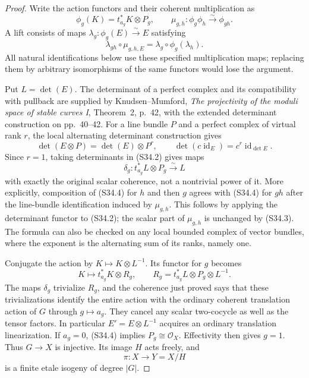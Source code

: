 \begin{proof}
Write the action functors and their coherent multiplication
as
\[
 \phi_g(K)=t_{a_g}^*K\otimes P_g,
 \qquad
 \mu_{g,h}:\phi_g\phi_h\xrightarrow{\sim}\phi_{gh}.
\]
A lift consists of maps
$\lambda_g:\phi_g(E)\xrightarrow{\sim}E$ satisfying
\[
 \lambda_{gh}\circ\mu_{g,h,E}
       =\lambda_g\circ\phi_g(\lambda_h).
 \tag{S34.2}
\]
All natural identifications below use these specified
multiplication maps; replacing them by arbitrary
isomorphisms of the same functors would lose the argument.

Put $L=\det(E)$. The determinant of a perfect complex and
its compatibility with pullback are supplied by
Knudsen--Mumford, \emph{The projectivity of the moduli
space of stable curves I}, Theorem~2, p.~42, with the
extended determinant construction on pp.~40--42.
For a line bundle $P$ and a perfect complex of virtual
rank $r$, the local alternating determinant construction
gives
\[
 \det(E\otimes P)=\det(E)\otimes P^r,
 \qquad \det(c\operatorname{id}_E)=c^r\operatorname{id}_{\det E}.
 \tag{S34.3}
\]
Since $r=1$, taking determinants in (S34.2) gives maps
\[
 \delta_g:t_{a_g}^*L\otimes P_g\xrightarrow{\sim}L
 \tag{S34.4}
\]
with exactly the original scalar coherence, not a nontrivial
power of it. More explicitly, composition of (S34.4) for
$h$ and then $g$ agrees with (S34.4) for $gh$ after the
line-bundle identification induced by $\mu_{g,h}$.
This follows by applying the determinant functor to
(S34.2); the scalar part of $\mu_{g,h}$ is unchanged by
(S34.3). The formula can also be checked on any local
bounded complex of vector bundles, where the exponent
is the alternating sum of its ranks, namely one.

Conjugate the action by $K\mapsto K\otimes L^{-1}$.
Its functor for $g$ becomes
\[
 K\longmapsto t_{a_g}^*K\otimes R_g,
 \qquad
 R_g=t_{a_g}^*L\otimes P_g\otimes L^{-1}.
 \tag{S34.5}
\]
The maps $\delta_g$ trivialize $R_g$, and the coherence
just proved says that these trivializations identify the
entire action with the ordinary coherent translation action
of $G$ through $g\mapsto a_g$. They cancel any scalar
two-cocycle as well as the tensor factors. In particular
$E'=E\otimes L^{-1}$ acquires an ordinary translation
linearization. If $a_g=0$, (S34.4) implies $P_g\cong
\mathcal O_X$. Effectivity then gives $g=1$. Thus
$G\to X$ is injective. Its image $H$ acts freely, and
\[
 \pi:X\longrightarrow Y=X/H
 \tag{S34.6}
\]
is a finite etale isogeny of degree $|G|$.


\end{proof}
